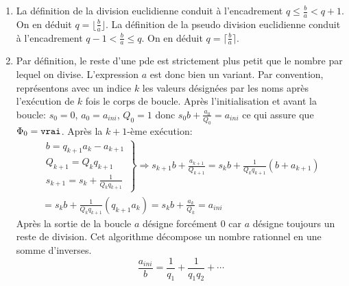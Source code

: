 \begin{enumerate}
  \item La définition de la division euclidienne conduit à l'encadrement $q\leq \frac{b}{a} < q+1$. On en déduit $q=\lfloor \frac{b}{a}\rfloor$.\newline
La définition de la pseudo division euclidienne conduit à l'encadrement $q-1 < \frac{b}{a} \leq  q$. On en déduit $q=\lceil \frac{b}{a}\rceil$.
\item Par définition, le reste d'une pde est strictement plus petit que le nombre par lequel on divise. L'expression $a$ est donc bien un variant.\newline
Par convention, représentons avec un indice $k$ les valeurs désignées par les noms après l'exécution de $k$ fois le corps de boucle.\newline
Après l'initialisation et avant la boucle: $s_0=0$, $a_0=a_{ini}$, $Q_0=1$ donc $s_0b+\frac{a_0}{Q_0}=a_{ini}$ ce qui assure que $\Phi_0=\verb|vrai|$.\newline
Après la $k+1$-ème exécution:
\begin{multline*}
\left. 
\begin{aligned}
b = q_{k+1}a_k - a_{k+1}\\
Q_{k+1} = Q_k q_{k+1}\\
s_{k+1} = s_k + \frac{1}{Q_k q_{k+1}}
\end{aligned}
\right\rbrace \Rightarrow
s_{k+1}b + \frac{a_{k+1}}{Q_{k+1}}=
s_kb+\frac{1}{Q_kq_{k+1}}(b+a_{k+1})\\
= s_kb+\frac{1}{Q_kq_{k+1}}(q_{k+1}a_k)
= s_kb+\frac{a_k}{Q_k} = a_{ini}
\end{multline*}
Après la sortie de la boucle $a$ désigne forcément $0$ car $a$ désigne toujours un reste de division. Cet algorithme décompose un nombre rationnel en une somme d'inverses.
\begin{displaymath}
  \frac{a_{ini}}{b} = \frac{1}{q_1}+ \frac{1}{q_1q_2}+ \cdots
\end{displaymath}

\end{enumerate}
